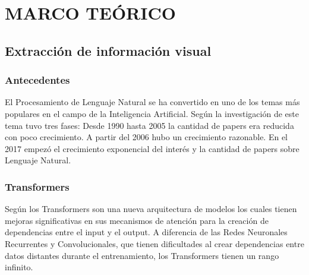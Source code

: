 \documentclass[../main.tex]{subfiles}
\begin{document}
\chapter{MARCO TEÓRICO}


\section{Extracción de información visual}

\subsection{Antecedentes}
El Procesamiento de Lenguaje Natural se ha convertido en uno de los temas más populares en el campo de la Inteligencia Artificial.
Según \citet{CHEN2022100001} la investigación de este tema tuvo tres fases:
Desde 1990 hasta 2005 la cantidad de papers era reducida con poco crecimiento.
A partir del 2006 hubo un crecimiento razonable.
En el 2017 empezó el crecimiento exponencial del interés y la cantidad de papers sobre Lenguaje Natural.

%


\subsection{Transformers}
Según \citet{vaswani2017attention} los Transformers son una nueva arquitectura de modelos los
cuales tienen mejoras significativas en sus mecanismos de atención para la creación de dependencias entre el input y el output.
A diferencia de las Redes Neuronales Recurrentes y Convolucionales, que tienen dificultades
al crear dependencias entre datos distantes durante el entrenamiento, los Transformers tienen
un rango infinito.
\end{document}
